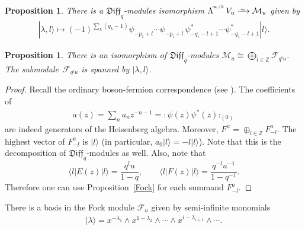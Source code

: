 \documentclass[pdftex]{sigma}
\numberwithin{equation}{section}
\newtheorem{Proposition}[Theorem]{Proposition}
\theoremstyle{definition}
\newcommand{\n}{|l \rangle}
\newcommand{\qD}{\mathfrak{Diff}_q}
\newcommand{\siL}{ \Lambda^{^{\! \infty/2}} \,}
\begin{document}
\begin{Proposition} \label{Prop:SemiInf-Fermi}
There is a $\qD$-modules isomorphism $\siL V_{u} \xrightarrow{
\,\smash{\raisebox{-0.65ex}{\ensuremath{\scriptstyle\sim}}}\,} \mathcal{M}_{u}$ given by
\begin{gather}\label{eq:lambda l}
| \lambda,l \rangle \mapsto (-1)^{\sum_k (q_k-1)} \psi_{-p_1+l} \cdots \psi_{-p_i+l} \, \psi_{-q_i-l+1}^* \cdots \psi_{-q_1-l+1}^* \n.
\end{gather}
\end{Proposition}

\begin{Proposition} \label{Boson-Fermion}
There is an isomorphism of $\qD$-modules $\mathcal{M}_u \cong \bigoplus_{l \in \mathbb{Z}} \mathcal{F}_{q^l u}$.
The sub\-module~$\mathcal{F}_{q^l u}$ is spanned by $| \lambda,l \rangle$.
\end{Proposition}

\begin{proof}Recall the ordinary boson-fermion correspondence (see \cite{KR}). The coefficients of
\begin{gather*}
a(z) = \sum_{n} a_n z^{-n-1} = : \! \psi(z) \psi^* (z) \! :_{(0)}
\end{gather*}
are indeed generators of the Heisenberg algebra. Moreover, $F^{\psi} = \oplus_{l \in \mathbb{Z}} F^{a}_{-l}$. The highest vector of $F^{a}_{-l}$ is $\n$ (in particular, $a_0 \n = -l \n $). Note that this is the decomposition of $\qD$-modules as well. Also, note that
\[\langle l | E(z) | l \rangle = \frac{q^{l} u }{1-q}, \qquad \langle l | F(z) | l \rangle = \frac{q^{-l} u^{-1} }{1-q^{-1}}.\]
Therefore one can use Proposition~\ref{Fock} for each summand $F^{a}_{-l}$.
\end{proof}

There is a basis in the Fock module $\mathcal{F}_u$ given by semi-infinite monomials
\begin{gather*}
|\lambda\rangle= x^{- \lambda_1} \wedge x^{1 - \lambda_2} \wedge \cdots \wedge x^{i - \lambda_{i+1}} \wedge \cdots.
\end{gather*}
\end{document}

